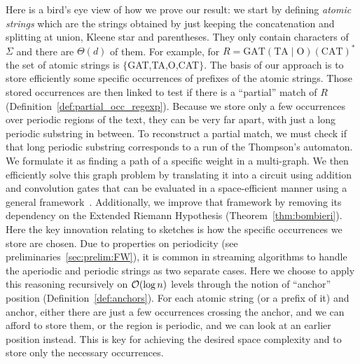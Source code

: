 Here is a bird's eye view of how we prove our result: we start by defining \emph{atomic strings} which are the strings obtained by just keeping the concatenation and splitting at union, Kleene star and parentheses. They only contain characters of $\Sigma$ and there are $\Theta(d)$ of them. For example, for $R= \mathrm{GAT}(\mathrm{TA}\mid \mathrm{O})(\mathrm{CAT})^*$  the set of atomic strings is $\{$GAT,TA,O,CAT$\}$.
%
The basis of our approach is to store efficiently some specific occurrences of prefixes of the atomic strings. Those stored occurrences are then linked to test if there is a “partial” match of $R$ (Definition~\ref*{def:partial_occ_regexp}). Because we store only a few occurrences over periodic regions of the text, they can be very far apart, with just a long periodic substring in between. To reconstruct a partial match, we must check if that long periodic substring corresponds to a run of the Thompson's automaton. We formulate it as finding a path of a specific weight in a multi-graph. We then efficiently solve this graph problem by translating it into a circuit using addition and convolution gates that can be evaluated in a space-efficient manner using a general framework~\cite{LokshtanovN10,Bringmann17}. Additionally, we improve that framework by removing its dependency on the Extended Riemann Hypothesis (Theorem~\ref{thm:bombieri}). 
Here the key innovation relating to sketches is how the specific occurrences we store are chosen. Due to properties on periodicity (see preliminaries~\ref{sec:prelim:FW}), it is common in streaming algorithms to handle the aperiodic and periodic strings as two separate cases.
Here we choose to apply this reasoning recursively on $\mathcal{O}(\log n)$ levels through the notion of ``anchor'' position (Definition~\ref{def:anchors}). For each atomic string (or a prefix of it) and anchor, either there are just a few occurrences crossing the anchor, and we can afford to store them, or the region is periodic, and we can look at an earlier position instead. This is key for achieving the desired space complexity and to store only the necessary occurrences.


